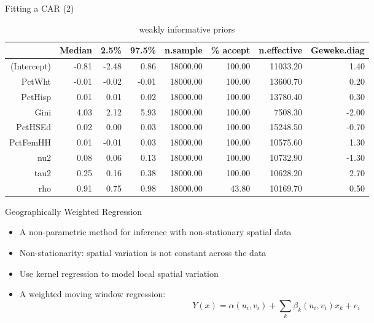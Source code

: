 \documentclass[aspectratio = 169, 12pt]{beamer}\usepackage[]{graphicx}\usepackage[]{color}
\begin{document}
\begin{frame}{Fitting a CAR (2)}
\begin{table}[ht]
\centering
\begin{tabular}{rrrrrrrr}
  \hline
 & Median & 2.5\% & 97.5\% & n.sample & \% accept & n.effective & Geweke.diag \\ 
  \hline
(Intercept) & -0.81 & -2.48 & 0.86 & 18000.00 & 100.00 & 11033.20 & 1.40 \\ 
  PctWht & -0.01 & -0.02 & -0.01 & 18000.00 & 100.00 & 13600.70 & 0.20 \\ 
  PctHisp & 0.01 & 0.01 & 0.02 & 18000.00 & 100.00 & 13780.40 & 0.30 \\ 
  Gini & 4.03 & 2.12 & 5.93 & 18000.00 & 100.00 & 7508.30 & -2.00 \\ 
  PctHSEd & 0.02 & 0.00 & 0.03 & 18000.00 & 100.00 & 15248.50 & -0.70 \\ 
  PctFemHH & 0.01 & -0.01 & 0.03 & 18000.00 & 100.00 & 10575.60 & 1.30 \\ 
  nu2 & 0.08 & 0.06 & 0.13 & 18000.00 & 100.00 & 10732.90 & -1.30 \\ 
  tau2 & 0.25 & 0.16 & 0.38 & 18000.00 & 100.00 & 10628.20 & 2.70 \\ 
  rho & 0.91 & 0.75 & 0.98 & 18000.00 & 43.80 & 10169.70 & 0.50 \\ 
   \hline
\end{tabular}
\caption{weakly informative priors} 
\end{table}

\end{frame}

\begin{frame}{Geographically Weighted Regression}
\begin{itemize}
\item A non-parametric method for inference with non-stationary spatial data
\item Non-stationarity: spatial variation is not constant across the data
\item Use kernel regression to model local spatial variation
\item A weighted moving window regression: $$ Y(x) = \alpha(u_i, v_i) + \sum_k \beta_k (u_i,v_i)x_k + e_i $$
\end{itemize}
\end{frame}
\end{document}
